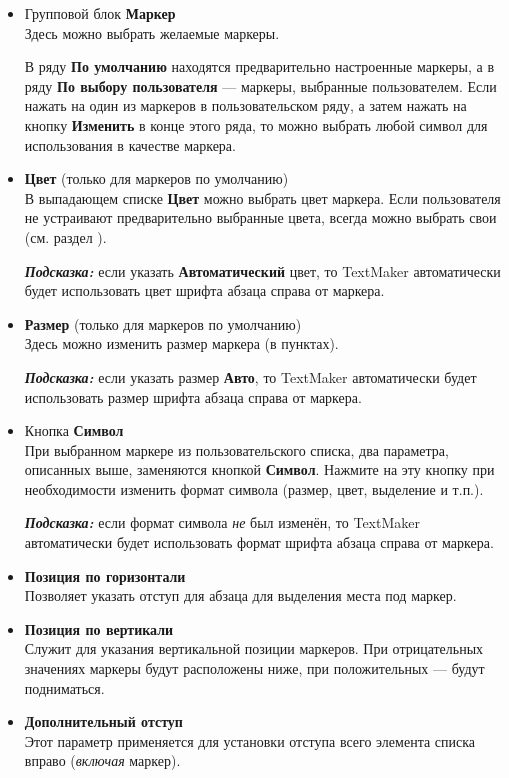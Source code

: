 ﻿\documentclass[a4paper,10pt]{article}
\begin{document}
\begin{itemize}
 \item Групповой блок \textbf{Маркер}\\
 Здесь можно выбрать желаемые маркеры.
 
 В ряду \textbf{По умолчанию} находятся предварительно настроенные маркеры, а в ряду \textbf{По выбору пользователя} — маркеры, выбранные пользователем. Если нажать на один из маркеров в пользовательском ряду, а затем нажать на кнопку \textbf{Изменить} в конце этого ряда, то можно выбрать любой символ для использования в качестве маркера.
 \item \textbf{Цвет} (только для маркеров по умолчанию)\\
 В выпадающем списке \textbf{Цвет} можно выбрать цвет маркера. Если пользователя не устраивают предварительно выбранные цвета, всегда можно выбрать свои (см. раздел ).
 
 \textit{\textbf{Подсказка:}} если указать \textbf{Автоматический} цвет, то TextMaker автоматически будет использовать цвет шрифта абзаца справа от маркера.
 \item \textbf{Размер} (только для маркеров по умолчанию)\\
 Здесь можно изменить размер маркера (в пунктах).
 
 \textbf{\textit{Подсказка:}} если указать размер \textbf{Авто}, то TextMaker автоматически будет использовать размер шрифта абзаца справа от маркера.
 
 \item Кнопка \textbf{Символ}\\
 При выбранном маркере из пользовательского списка, два параметра, описанных выше, заменяются кнопкой \textbf{Символ}. Нажмите на эту кнопку при необходимости изменить формат символа (размер, цвет, выделение и т.п.).
 
 \textbf{\textit{Подсказка:}} если формат символа \textit{не} был изменён, то TextMaker автоматически будет использовать формат шрифта абзаца справа от маркера. 
 \item \textbf{Позиция по горизонтали}\\
 Позволяет указать отступ для абзаца для выделения места под маркер.
 \item \textbf{Позиция по вертикали}\\
 Служит для указания вертикальной позиции маркеров. При отрицательных значениях маркеры будут расположены ниже, при положительных — будут подниматься.
 \item \textbf{Дополнительный отступ}\\
 Этот параметр применяется для установки отступа всего элемента списка вправо (\textit{включая} маркер).
\end{itemize}
\end{document}
